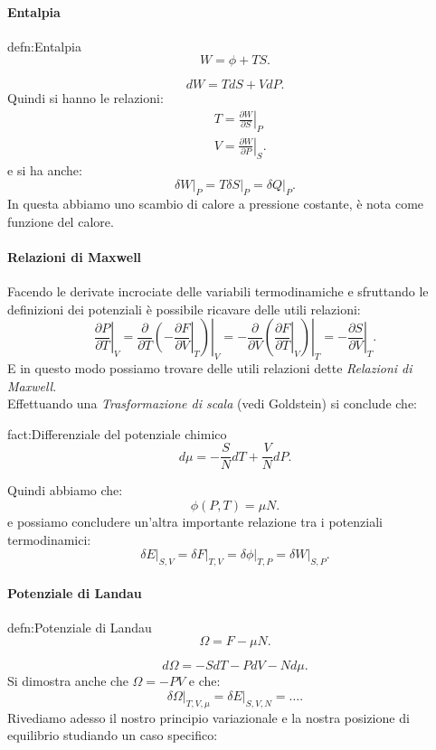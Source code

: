\paragraph{Entalpia}%
\begin{defn}[Entalpia]{defn:Entalpia}
\[
	W = \phi + TS
.\] 
\end{defn}
\[
	dW = TdS + VdP
.\] 
Quindi si hanno le relazioni:
\begin{align}
	&T = \left.\frac{\partial W}{\partial S}\right|_{P}\\
	&V = \left.\frac{\partial W}{\partial P} \right|_{S}
.\end{align}
e si ha anche:
\[
	 \left.\delta W\right|_{P} = T \left.\delta S\right|_{P}= \left.\delta Q\right|_{P}
.\] 
In questa abbiamo uno scambio di calore a pressione costante, è nota come funzione del calore.\\
\paragraph{Relazioni di Maxwell}%
\label{par:Relazioni di Maxwell}
Facendo le derivate incrociate delle variabili termodinamiche e sfruttando le definizioni dei potenziali è possibile ricavare delle utili relazioni:
\[
	\left.\frac{\partial P}{\partial T} \right|_{V}=
	\left.\frac{\partial }{\partial T} \left.\left( -\frac{\partial F}{\partial V}\right|_{T}  \right) \right|_{V}
	= -\left.\frac{\partial }{\partial V}\left(  \left.\frac{\partial F}{\partial T} \right|_{V}  \right) \right|_{T} =
	-\left.\frac{\partial S}{\partial V} \right|_{T} 
.\] 
E in questo modo possiamo trovare delle utili relazioni dette \textit{Relazioni di Maxwell}.\\
Effettuando una \textit{Trasformazione di scala} (vedi Goldstein) si conclude che:
\begin{fact}{fact:Differenziale del potenziale chimico}
\[
	d\mu = - \frac{S}{N}dT + \frac{V}{N}dP 
.\]
\end{fact}
Quindi abbiamo che:
\[
	\phi\left( P,T \right) = \mu N
.\] 
e possiamo concludere un'altra importante relazione tra i potenziali termodinamici:
\[
	\left.\delta E\right|_{S,V} = \left.\delta F\right|_{T,V} = \left.\delta \phi\right|_{T,P} = \left.\delta W\right|_{S, P}
.\] 
\paragraph{Potenziale di Landau}%
\begin{defn}{defn:Potenziale di Landau}
\[
	\Omega = F - \mu N
.\] 
\end{defn}
\[
	d\Omega = -SdT - PdV - Nd\mu
.\] 
Si dimostra anche che $\Omega = -PV$ e che:
\[
	\left.\delta \Omega\right|_{T,V,\mu} = \left.\delta E\right|_{S, V, N}= \ldots
.\] 
Rivediamo adesso il nostro principio variazionale e la nostra posizione di equilibrio studiando un caso specifico:
